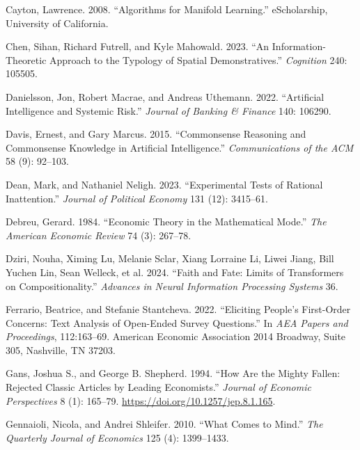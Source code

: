 \documentclass[
]{article}
\newlength{\cslhangindent}
\newenvironment{CSLReferences}[2] %
 {\begin{list}{}{%
  \setlength{\itemindent}{0pt}
  \setlength{\leftmargin}{0pt}
  \setlength{\parsep}{0pt}
  \ifodd #1
   \setlength{\leftmargin}{\cslhangindent}
   \setlength{\itemindent}{-1\cslhangindent}
  \fi
  \setlength{\itemsep}{#2\baselineskip}}}
 {\end{list}}
\begin{document}
\begin{CSLReferences}{1}{0}
Cayton, Lawrence. 2008. {``Algorithms for Manifold Learning.''}
eScholarship, University of California.

Chen, Sihan, Richard Futrell, and Kyle Mahowald. 2023. {``An
Information-Theoretic Approach to the Typology of Spatial
Demonstratives.''} \emph{Cognition} 240: 105505.

Danielsson, Jon, Robert Macrae, and Andreas Uthemann. 2022.
{``Artificial Intelligence and Systemic Risk.''} \emph{Journal of
Banking \& Finance} 140: 106290.

Davis, Ernest, and Gary Marcus. 2015. {``Commonsense Reasoning and
Commonsense Knowledge in Artificial Intelligence.''}
\emph{Communications of the ACM} 58 (9): 92--103.

Dean, Mark, and Nathaniel Neligh. 2023. {``Experimental Tests of
Rational Inattention.''} \emph{Journal of Political Economy} 131 (12):
3415--61.

Debreu, Gerard. 1984. {``Economic Theory in the Mathematical Mode.''}
\emph{The American Economic Review} 74 (3): 267--78.

Dziri, Nouha, Ximing Lu, Melanie Sclar, Xiang Lorraine Li, Liwei Jiang,
Bill Yuchen Lin, Sean Welleck, et al. 2024. {``Faith and Fate: Limits of
Transformers on Compositionality.''} \emph{Advances in Neural
Information Processing Systems} 36.

Ferrario, Beatrice, and Stefanie Stantcheva. 2022. {``Eliciting People's
First-Order Concerns: Text Analysis of Open-Ended Survey Questions.''}
In \emph{AEA Papers and Proceedings}, 112:163--69. American Economic
Association 2014 Broadway, Suite 305, Nashville, TN 37203.

Gans, Joshua S., and George B. Shepherd. 1994. {``How Are the Mighty
Fallen: Rejected Classic Articles by Leading Economists.''}
\emph{Journal of Economic Perspectives} 8 (1): 165--79.
\url{https://doi.org/10.1257/jep.8.1.165}.

Gennaioli, Nicola, and Andrei Shleifer. 2010. {``What Comes to Mind.''}
\emph{The Quarterly Journal of Economics} 125 (4): 1399--1433.


\end{CSLReferences}
\end{document}

